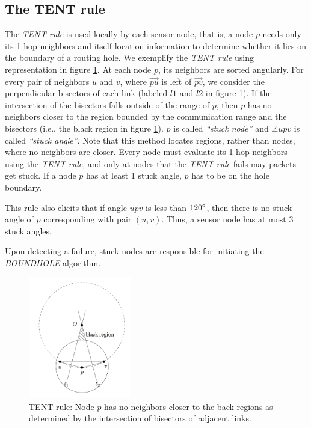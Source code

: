 \subsection{The TENT rule}
The \emph{TENT rule} is used locally by each sensor node, that is, a node $p$ needs only its 1-hop neighbors and itself location information to determine whether it lies on the boundary of a routing hole. We exemplify the \emph{TENT rule} using representation in figure \ref{tent-rule}. At each node $p$, its neighbors are sorted angularly. For every pair of neighbors $u$ and $v$, where $\overrightarrow{pu}$ is left of $\overrightarrow{pv}$, we consider the perpendicular bisectors of each link (labeled $l1$ and $l2$ in figure \ref{tent-rule}). If the intersection of the bisectors falls outside of the range of $p$, then $p$ has no neighbors closer to the region bounded by the communication range and the bisectors (i.e., the black region in figure \ref{tent-rule}). $p$ is called \emph{``stuck node''} and $\angle upv$ is called \emph{``stuck angle''}. Note that this method locates regions, rather than nodes, where no neighbors are closer. Every node must evaluate its 1-hop neighbors using the \emph{TENT rule}, and only at nodes that the \emph{TENT rule} fails may packets get stuck. If a node $p$ has at least 1 stuck angle, $p$ has to be on the hole boundary. 

This rule also elicits that if angle $upv$ is less than $120\degree$, then there is no stuck angle of $p$ corresponding with pair $(u,v)$. Thus, a sensor node has at most 3 stuck angles.

Upon detecting a failure, stuck nodes are responsible for initiating the \emph{BOUNDHOLE} algorithm.

\begin{figure}[!htb]
\centering
\includegraphics[width=0.4\textwidth]{Chapter3/Chapter3Figs/fig-stuck-node.png} %
\caption{TENT rule: Node $p$ has no neighbors closer to the back regions as determined by the intersection of bisectors of adjacent links.}
\label{tent-rule}
\end{figure}

